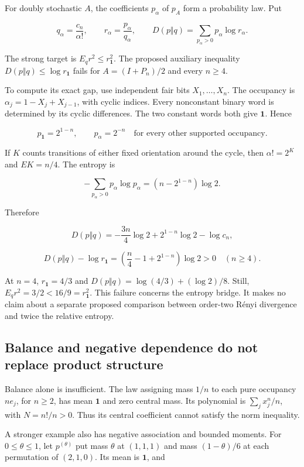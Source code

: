 For doubly stochastic \(A\), the coefficients \(p_\alpha\) of \(p_A\) form a probability law. Put

\[
q_\alpha=\frac{c_n}{\alpha!},\qquad r_\alpha=\frac{p_\alpha}{q_\alpha},\qquad
D(p\Vert q)=\sum_{p_\alpha>0}p_\alpha\log r_\alpha.
\]

The strong target is \(E_qr^2\le r_{\mathbf1}^2\). The proposed auxiliary inequality \(D(p\Vert q)\le\log r_{\mathbf1}\) fails for \(A=(I+P_n)/2\) and every \(n\ge4\).

To compute its exact gap, use independent fair bits \(X_1,\ldots,X_n\). The occupancy is \(\alpha_j=1-X_j+X_{j-1}\), with cyclic indices. Every nonconstant binary word is determined by its cyclic differences. The two constant words both give \(\mathbf1\). Hence

\[
p_{\mathbf1}=2^{1-n},\qquad p_\alpha=2^{-n}
\quad\text{for every other supported occupancy}.
\]

If \(K\) counts transitions of either fixed orientation around the cycle, then \(\alpha!=2^K\) and \(EK=n/4\). The entropy is

\[
-\sum_{p_\alpha>0}p_\alpha\log p_\alpha=(n-2^{1-n})\log2.
\]

Therefore

\[
D(p\Vert q)=-\frac{3n}{4}\log2+2^{1-n}\log2-\log c_n,
\]

\[
D(p\Vert q)-\log r_{\mathbf1}
=\left(\frac n4-1+2^{1-n}\right)\log2>0\quad(n\ge4).
\]

At \(n=4\), \(r_{\mathbf1}=4/3\) and \(D(p\Vert q)=\log(4/3)+(\log2)/8\). Still, \(E_qr^2=3/2<16/9=r_{\mathbf1}^2\). This failure concerns the entropy bridge. It makes no claim about a separate proposed comparison between order-two Rényi divergence and twice the relative entropy.

\subsection{Balance and negative dependence do not replace product structure}\label{app:additional-14}

Balance alone is insufficient. The law assigning mass \(1/n\) to each pure occupancy \(ne_j\), for \(n\ge2\), has mean \(\mathbf1\) and zero central mass. Its polynomial is \(\sum_jx_j^n/n\), with \(N=n!/n>0\). Thus its central coefficient cannot satisfy the norm inequality.

A stronger example also has negative association and bounded moments. For \(0\le\theta\le1\), let \(p^{(\theta)}\) put mass \(\theta\) at \((1,1,1)\) and mass \((1-\theta)/6\) at each permutation of \((2,1,0)\). Its mean is \(\mathbf1\), and

